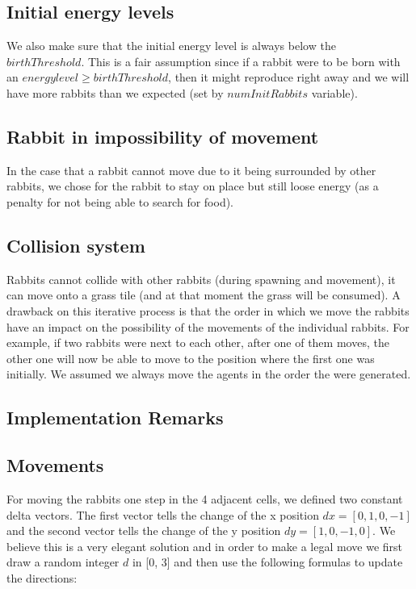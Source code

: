 \documentclass[11pt]{article}
\begin{document}
\subsection* {Initial energy levels}
We also make sure that the initial energy level is always below the $birthThreshold$. This is a fair assumption since if a rabbit were to be born with an $energy level \geq birthThreshold$, then it might reproduce right away and we will have more rabbits than we expected (set by $numInitRabbits$ variable).

\subsection* {Rabbit in impossibility of movement}

In the case that a rabbit cannot move due to it being surrounded by other rabbits, we chose for the rabbit to stay on place but still loose energy (as a penalty for not being able to search for food).

\subsection* {Collision system}

Rabbits cannot collide with other rabbits (during spawning and movement), it can move onto a grass tile (and at that moment the grass will be consumed). A drawback on this iterative process is that the order in which we move the rabbits have an impact on the possibility of the movements of the individual rabbits. For example, if two rabbits were next to each other, after one of them moves, the other one will now be able to move to the position where the first one was initially. We assumed we always move the agents in the order the were generated.

\subsection{Implementation Remarks}

\subsection* {Movements}

For moving the rabbits one step in the 4 adjacent cells, we defined two constant delta vectors. The first vector tells the change of the x position $dx = [0, 1,  0, -1]$ and the second vector tells the change of the y position $dy = [1, 0, -1,  0]$. We believe this is a very elegant solution and in order to make a legal move we first draw a random integer $d$ in [0, 3] and then use the following formulas to update the directions:
\end{document}
